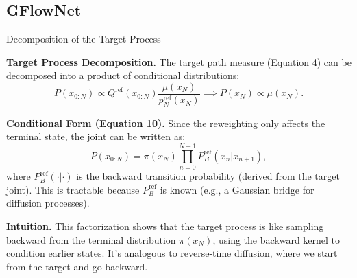 \documentclass[aspectratio=169,xcolor=dvipsnames]{beamer}
\begin{document}






\subsection{GFlowNet}

\begin{frame}[t]{Decomposition of the Target Process}
\footnotesize

\textbf{Target Process Decomposition.} The target path measure (Equation 4) can be decomposed into a product of conditional distributions:
\[
P(x_{0:N}) \propto Q^{\text{ref}}(x_{0:N}) \frac{\mu(x_N)}{p^{\text{ref}}_N(x_N)} \implies P(x_N) \propto \mu(x_N).
\]

\textbf{Conditional Form (Equation 10).} Since the reweighting only affects the terminal state, the joint can be written as:
\[
P(x_{0:N}) = \pi(x_N) \prod_{n=0}^{N-1} P_B^{\text{ref}}(x_n | x_{n+1}),
\]
where $P_B^{\text{ref}}(\cdot | \cdot)$ is the backward transition probability (derived from the target joint). This is tractable because $P_B^{\text{ref}}$ is known (e.g., a Gaussian bridge for diffusion processes).

\textbf{Intuition.} This factorization shows that the target process is like sampling backward from the terminal distribution $\pi(x_N)$, using the backward kernel to condition earlier states. It's analogous to reverse-time diffusion, where we start from the target and go backward.

\end{frame}
\end{document}
